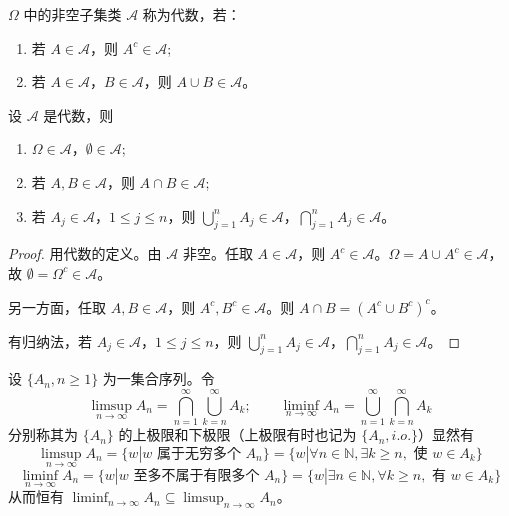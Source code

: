 \documentclass[lang=cn,10pt,thmcnt=section]{elegantbook}
\begin{document}
\begin{definition}
	\(\Omega\) 中的非空子集类 \(\mathscr{A}\) 称为代数，若：
\begin{enumerate}
    \item 若 \(A \in \mathscr{A}\)，则 \(A^c \in \mathscr{A}\);
    \item 若 \(A \in \mathscr{A}\)，\(B \in \mathscr{A}\)，则 \(A \cup B \in \mathscr{A}\)。
\end{enumerate}
\end{definition}
\begin{theorem}
	设 \(\mathscr{A}\) 是代数，则
\begin{enumerate}
    \item \(\Omega \in \mathscr{A}\)，\(\emptyset \in \mathscr{A}\);
    \item 若 \(A, B \in \mathscr{A}\)，则 \(A \cap B \in \mathscr{A}\);
    \item 若 \(A_j \in \mathscr{A}\)，\(1 \leq j \leq n\)，则 \(\bigcup_{j=1}^{n} A_j \in \mathscr{A}\)，\(\bigcap_{j=1}^{n} A_j \in \mathscr{A}\)。
\end{enumerate}
\end{theorem}
\begin{proof}
	\quad 用代数的定义。由 \(\mathscr{A}\) 非空。任取 \(A \in \mathscr{A}\)，则 \(A^c \in \mathscr{A}\)。\(\Omega = A \cup A^c \in \mathscr{A}\)，故 \(\emptyset = \Omega^c \in \mathscr{A}\)。

另一方面，任取 \(A, B \in \mathscr{A}\)，则 \(A^c, B^c \in \mathscr{A}\)。则 \(A \cap B = (A^c \cup B^c)^c\)。

有归纳法，若 \(A_j \in \mathscr{A}\)，\(1 \leq j \leq n\)，则 \(\bigcup_{j=1}^{n} A_j \in \mathscr{A}\)，\(\bigcap_{j=1}^{n} A_j \in \mathscr{A}\)。
\end{proof}
\begin{definition}
	设 \(\{A_n, n \geq 1\}\) 为一集合序列。令
\[
\limsup_{n \to \infty} A_n = \bigcap_{n=1}^{\infty} \bigcup_{k=n}^{\infty} A_k; \qquad \liminf_{n \to \infty} A_n = \bigcup_{n=1}^{\infty} \bigcap_{k=n}^{\infty} A_k
\]
分别称其为 \(\{A_n\}\) 的上极限和下极限（上极限有时也记为 \(\{A_n, i.o.\}\)）显然有
\[
\limsup_{n \to \infty} A_n = \{w | w \text{ 属于无穷多个 } A_n\} = \{w | \forall n \in \mathbb{N}, \exists k \geq n, \text{ 使 } w \in A_k\}
\]
\[
\liminf_{n \to \infty} A_n = \{w | w \text{ 至多不属于有限多个 } A_n\} = \{w | \exists n \in \mathbb{N}, \forall k \geq n, \text{ 有 } w \in A_k\}
\]
从而恒有 \(\liminf_{n \to \infty} A_n \subseteq \limsup_{n \to \infty} A_n\)。
\end{definition}
\end{document}
